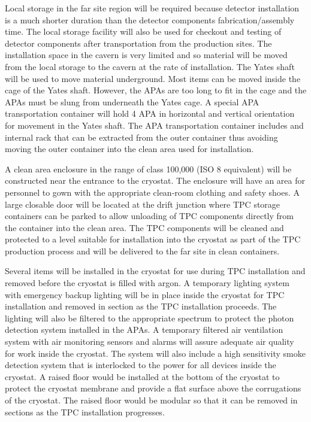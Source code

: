 Local storage in the far site region will be required because detector installation is a much shorter duration 
than the detector components fabrication/assembly time. The local storage facility will also be used for 
checkout and testing of detector components after transportation from the production sites. The 
installation space in the cavern is very limited and so material will be moved from the local storage to the 
cavern at the rate of installation. The Yates shaft will be used to move material underground. Most items 
can be moved inside the cage of the Yates shaft. However, the APAs are too long to fit in the cage and the 
APAs must be slung from underneath the Yates cage. A special APA transportation container will hold 4 
APA in horizontal and vertical orientation for movement in the Yates shaft.  The APA transportation 
container includes and internal rack that can be extracted from the outer container thus avoiding moving 
the outer container into the clean area used for installation.

A clean area enclosure in the range of class 100,000 (ISO 8 equivalent) will be constructed near the 
entrance to the cryostat. The enclosure will have an area for personnel to gown with the appropriate 
clean-room clothing and safety shoes. A large closable door will be located at the drift junction where 
TPC storage containers can be parked to allow unloading of TPC components directly from the container 
into the clean area. The TPC components will be cleaned and protected to a level suitable for installation 
into the cryostat as part of the TPC production process and will be delivered to the far site in clean 
containers.

Several items will be installed in the cryostat for use during TPC installation and removed before the 
cryostat is filled with argon. A temporary lighting system with emergency backup lighting will be in place 
inside the cryostat for TPC installation and removed in section as the TPC installation proceeds. The 
lighting will also be filtered to the appropriate spectrum to protect the photon detection system installed 
in the APAs. A temporary filtered air ventilation system with air monitoring sensors and alarms will assure 
adequate air quality for work inside the cryostat. The system will also include a high sensitivity smoke 
detection system that is interlocked to the power for all devices inside the cryostat. A raised floor would 
be installed at the bottom of the cryostat to protect the cryostat membrane and provide a flat surface 
above the corrugations of the cryostat. The raised floor would be modular so that it can be removed in 
sections as the TPC installation progresses.

